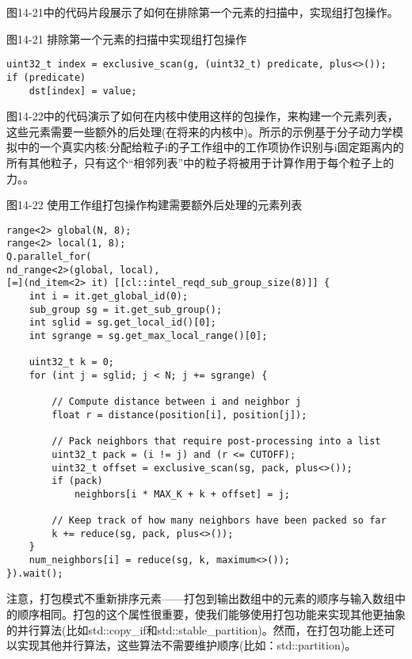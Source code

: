 图14-21中的代码片段展示了如何在排除第一个元素的扫描中，实现组打包操作。\par

\hspace*{\fill} \par %
图14-21 排除第一个元素的扫描中实现组打包操作
\begin{lstlisting}[caption={}]
uint32_t index = exclusive_scan(g, (uint32_t) predicate, plus<>());
if (predicate)
	dst[index] = value;
\end{lstlisting}

图14-22中的代码演示了如何在内核中使用这样的包操作，来构建一个元素列表，这些元素需要一些额外的后处理(在将来的内核中)。所示的示例基于分子动力学模拟中的一个真实内核:分配给粒子i的子工作组中的工作项协作识别与i固定距离内的所有其他粒子，只有这个“相邻列表”中的粒子将被用于计算作用于每个粒子上的力。。\par

\hspace*{\fill} \par %
图14-22 使用工作组打包操作构建需要额外后处理的元素列表
\begin{lstlisting}[caption={}]
range<2> global(N, 8);
range<2> local(1, 8);
Q.parallel_for(
nd_range<2>(global, local),
[=](nd_item<2> it) [[cl::intel_reqd_sub_group_size(8)]] {
	int i = it.get_global_id(0);
	sub_group sg = it.get_sub_group();
	int sglid = sg.get_local_id()[0];
	int sgrange = sg.get_max_local_range()[0];
	
	uint32_t k = 0;
	for (int j = sglid; j < N; j += sgrange) {
		
		// Compute distance between i and neighbor j
		float r = distance(position[i], position[j]);
		
		// Pack neighbors that require post-processing into a list
		uint32_t pack = (i != j) and (r <= CUTOFF);
		uint32_t offset = exclusive_scan(sg, pack, plus<>());
		if (pack)
			neighbors[i * MAX_K + k + offset] = j;
		
		// Keep track of how many neighbors have been packed so far
		k += reduce(sg, pack, plus<>());
	}
	num_neighbors[i] = reduce(sg, k, maximum<>());
}).wait();
\end{lstlisting}

注意，打包模式不重新排序元素——打包到输出数组中的元素的顺序与输入数组中的顺序相同。打包的这个属性很重要，使我们能够使用打包功能来实现其他更抽象的并行算法(比如std::copy\_if和std::stable\_partition)。然而，在打包功能上还可以实现其他并行算法，这些算法不需要维护顺序(比如：std::partition)。\par

